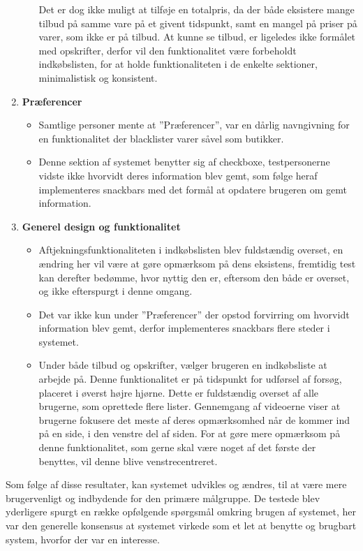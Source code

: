 \begin{enumerate}
\begin{itemize}
   								  Det er dog ikke muligt at tilføje en totalpris, da der både eksistere mange tilbud på samme vare på et givent tidspunkt, samt en mangel på priser på varer, som ikke er på tilbud.
   								  At kunne se tilbud, er ligeledes ikke formålet med opskrifter, derfor vil den funktionalitet være forbeholdt indkøbslisten, for at holde funktionaliteten i de enkelte sektioner, minimalistisk og konsistent.
   							   \end{itemize}
   \item \textbf{Præferencer}\begin{itemize}
   								  \item Samtlige personer mente at ''Præferencer'', var en dårlig navngivning for en funktionalitet der blacklister varer såvel som butikker.
   								  \item Denne sektion af systemet benytter sig af checkboxe, testpersonerne vidste ikke hvorvidt deres information blev gemt, som følge heraf implementeres snackbars med det formål at opdatere brugeren om gemt information. 
   							   \end{itemize}
   \item \textbf{Generel design og funktionalitet}\begin{itemize}
   								  \item Aftjekningsfunktionaliteten i indkøbslisten blev fuldstændig overset, en ændring her vil være at gøre opmærksom på dens eksistens, fremtidig test kan derefter bedømme, hvor nyttig den er, eftersom den både er overset, og ikke efterspurgt i denne omgang.
   								  \item Det var ikke kun under ''Præferencer'' der opstod forvirring om hvorvidt information blev gemt, derfor implementeres snackbars flere steder i systemet.
   								  \item Under både tilbud og opskrifter, vælger brugeren en indkøbsliste at arbejde på. 
   								  Denne funktionalitet er på tidspunkt for udførsel af forsøg, placeret i øverst højre hjørne. 
   								  Dette er fuldstændig overset af alle brugerne, som oprettede flere lister.
   								  Gennemgang af videoerne viser at brugerne fokusere det meste af deres opmærksomhed når de kommer ind på en side, i den venstre del af siden.
   								  For at gøre mere opmærksom på denne funktionalitet, som gerne skal være noget af det første der benyttes, vil denne blive venstrecentreret.
   							   \end{itemize}
\end{enumerate}

Som følge af disse resultater, kan systemet udvikles og ændres, til at være mere brugervenligt og indbydende for den primære målgruppe.
De testede blev yderligere spurgt en række opfølgende spørgsmål omkring brugen af systemet, her var den generelle konsensus at systemet virkede som et let at benytte og brugbart system, hvorfor der var en interesse.